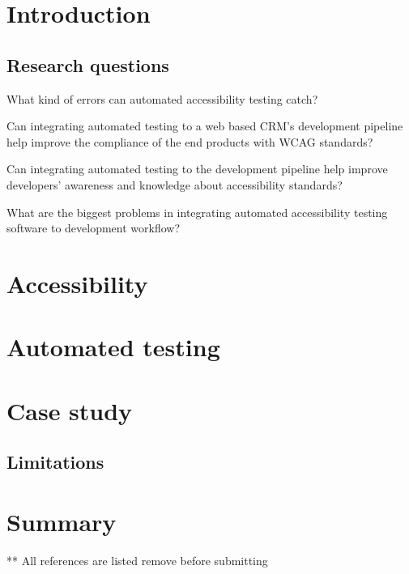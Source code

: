 \documentclass{master_thesis}
\begin{document}

\section{Introduction}

\subsection{Research questions}

\begin{RQlist}
    \item What kind of errors can automated accessibility testing catch?
    \item Can integrating automated testing to a web based CRM’s development pipeline help improve the compliance of the end products with WCAG standards?
    \item Can integrating automated testing to the development pipeline help improve developers’ awareness and knowledge about accessibility standards?
    \item What are the biggest problems in integrating automated accessibility testing software to development workflow?
\end{RQlist}
\section{Accessibility}
% 

\section{Automated testing}
% 

\section{Case study}
% 
\subsection{Limitations}

\section{Summary}

\pagebreak
** All references are listed remove before submitting
\printbibliography
\end{document}
